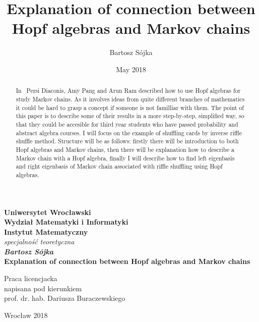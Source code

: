 \documentclass[a4paper]{article}
\title{Explanation of connection between Hopf algebras and Markov chains}
\author{Bartosz Sójka}
\date{May 2018}
\begin{document}
\thispagestyle{empty}
\begin{center}
\textbf{\large Uniwersytet Wrocławski\\
Wydział Matematyki i Informatyki\\
Instytut Matematyczny}\\
\textit{\large specjalność teoretyczna}\\
\vspace{4cm}
\textbf{\textit{\large Bartosz Sójka}\\
\vspace{0.5cm}
{\Large Explanation of connection between Hopf algebras and Markov chains}}\\
\end{center}
\vspace{3cm}
{\large \hspace*{6.5cm}Praca licencjacka\\
\hspace*{6.5cm}napisana pod kierunkiem\\
\hspace*{6.5cm}prof. dr. hab. Dariusza Buraczewskiego }\\
\vfill
\begin{center}
{\large Wrocław 2018}\\
\end{center}
\newpage
\null
\thispagestyle{empty}
\newpage
\begin{abstract}

In~\cite{Diaconis2014} Persi Diaconis, Amy Pang and Arun Ram described how to use Hopf algebras for
study Markov chains. As it involves ideas from quite different branches of mathematics it could be hard to
grasp a concept if someone is not familliar with them.
The point of this paper is to describe some of their results in a more step-by-step, simplified way,
so that they could be accesible for third year students who have passed probability
and abstract algebra courses. I will focus on the example of shuffling cards by inverse riffle shuffle method.
Structure will be as follows: firstly there will be introduction to both Hopf algebras and Markov chains,
then there will be explanation how to describe a Markov chain with a Hopf algebra, finally I will describe
how to find left eigenbasis and right eigenbasis of Markov chain associated with riffle shuffling
using Hopf algebras.


\end{abstract}
\end{document}
